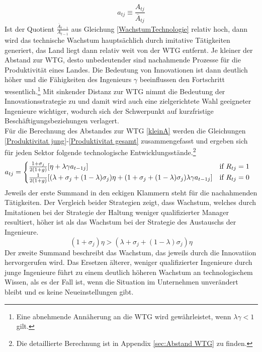 %
	\begin{equation}
		a_{tj}\equiv\frac{A_{tj}}{\overline{A}_{tj}}\label{kleinA}
	\end{equation}
%
Ist der Quotient $\frac{\overline{A}_{t-1}}{A_{t-1}}$ aus Gleichung \eqref{WachstumTechnologie} relativ hoch, dann wird das technische Wachstum hauptsächlich durch imitative Tätigkeiten generiert, das Land liegt dann relativ weit von der WTG entfernt. Je kleiner der Abstand zur WTG, desto unbedeutender sind nachahmende Prozesse für die Produktivität eines Landes. Die Bedeutung von Innovationen ist dann deutlich höher und die Fähigkeiten des Ingenieurs $\gamma$ beeinflussen den Fortschritt wesentlich.\footnote{Eine abnehmende Annäherung an die WTG wird gewährleistet, wenn $\lambda\gamma<1$ gilt.}
%
Mit sinkender Distanz zur WTG nimmt die Bedeutung der Innovationsstrategie zu und damit wird auch eine zielgerichtete Wahl geeigneter Ingenieure wichtiger, wodurch sich der Schwerpunkt auf kurzfristige Beschäftigungsbeziehungen verlagert.\\
%
Für die Berechnung des Abstandes zur WTG \eqref{kleinA} werden die Gleichungen \eqref{Produktivitat jung}-\eqref{Produktivitat gesamt} zusammengefasst und ergeben sich für jeden Sektor folgende technologische Entwicklungsstände.\footnote{Die detaillierte Berechnung ist in Appendix \ref{sec:Abstand WTG} zu finden.}
%
	\begin{equation}
		a_{tj}=\begin{cases}\frac{1+\sigma_j}{2(1+g)}[\eta+\lambda \gamma a_{t-1j}] \hfill\text{if  } R_{tj}=1 \\
		\frac{1}{2(1+g)}[(\lambda+\sigma_j+(1-\lambda)\sigma_j)\eta+(1+\sigma_j+(1-\lambda)\sigma_j)\lambda\gamma a_{t-1 j}] \quad\hfill\text{if   }R_{tj}=0
		\end{cases}\label{Abstand WTG}
	\end{equation}
%
Jeweils der erste Summand in den eckigen Klammern steht für die nachahmenden Tätigkeiten. Der Vergleich beider Strategien zeigt, dass Wachstum, welches durch Imitationen bei der Strategie der Haltung weniger qualifizierter Manager resultiert, höher ist als das Wachstum bei der Strategie des Austauschs der Ingenieure.
%
	\begin{equation}
		(1+\sigma_j)\eta>(\lambda+\sigma_j+(1-\lambda)\sigma_j)\eta
	\end{equation}
%
Der zweite Summand beschreibt das Wachstum, das jeweils durch die Innovatiion hervorgerufen wird. Das Ersetzen älterer, weniger qualifizierter Ingenieure durch junge Ingenieure führt zu einem deutlich höheren Wachstum an technologischem Wissen, als es der Fall ist, wenn die Situation im Unternehmen unverändert bleibt und es keine Neueinstellungen gibt.
